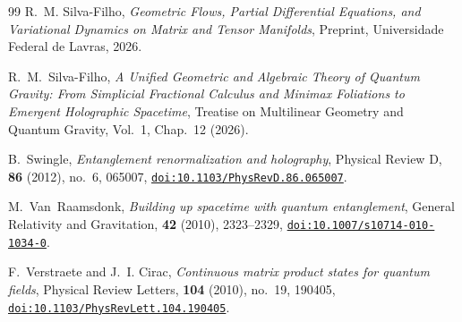 \documentclass[11pt,a4paper,reqno]{amsart}
\theoremstyle{definition}
\numberwithin{equation}{section}
\providecommand{\doi}[1]{\href{https://doi.org/#1}{\nolinkurl{doi:#1}}}
\begin{document}
\begin{thebibliography}{99}
R.~M. Silva-Filho,
\emph{Geometric Flows, Partial Differential Equations, and Variational Dynamics on Matrix and Tensor Manifolds},
Preprint, Universidade Federal de Lavras, 2026.

R.~M.~Silva-Filho,
\emph{A Unified Geometric and Algebraic Theory of Quantum Gravity: From Simplicial Fractional Calculus and Minimax Foliations to Emergent Holographic Spacetime},
Treatise on Multilinear Geometry and Quantum Gravity, Vol.~1, Chap.~12 (2026).

B.~Swingle,
\emph{Entanglement renormalization and holography},
Physical Review D, \textbf{86} (2012), no.~6, 065007,
\doi{10.1103/PhysRevD.86.065007}.

M.~Van~Raamsdonk,
\emph{Building up spacetime with quantum entanglement},
General Relativity and Gravitation, \textbf{42} (2010), 2323--2329,
\doi{10.1007/s10714-010-1034-0}.

F.~Verstraete and J.~I. Cirac,
\emph{Continuous matrix product states for quantum fields},
Physical Review Letters, \textbf{104} (2010), no.~19, 190405,
\doi{10.1103/PhysRevLett.104.190405}.

\end{thebibliography}
\end{document}
